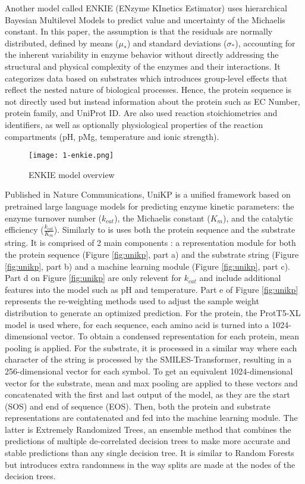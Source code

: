 Another model called ENKIE (ENzyme KInetics Estimator) uses hierarchical Bayesian Multilevel
Models to predict value and uncertainty of the Michaelis constant. In this paper, the assumption is that
the residuals are normally distributed, defined by means ($\mu_*$) and standard deviations ($\sigma_*$), 
accounting for the inherent variability in enzyme behavior without directly addressing 
the structural and physical complexity of the enzymes and their interactions. It categorizes data based on
substrates which introduces group-level effects that reflect the nested nature of 
biological processes. Hence, the protein sequence is not directly used but instead information about the
protein such as EC Number, protein family, and UniProt ID. Are also used reaction stoichiometries and
identifiers, as well as optionally physiological properties of the reaction compartments (pH, pMg, 
temperature and ionic strength).

\begin{figure}
  \centering
  \texttt{[image: 1-enkie.png]}
  \caption{ENKIE model overview}
  \label{fig:enkie}
\end{figure}

Published in Nature Communications, UniKP is a unified framework based on pretrained large language models
for predicting enzyme kinetic parameters: the enzyme turnover number ($k_{cat}$), the Michaelis constant
($K_m$), and the catalytic efficiency ($\frac{k_{cat}}{K_m}$). Similarly to \citeauthor{km1} is uses both the
protein sequence and the substrate string. It is comprised of 2 main components : a representation module 
for both the protein sequence (Figure \ref{fig:unikp}, part a) and the substrate string 
(Figure \ref{fig:unikp}, part b) and a machine learning module (Figure \ref{fig:unikp}, part c). 
Part d on Figure \ref{fig:unikp} are only relevent for $k_{cat}$ and include additional features into the model
such as pH and temperature. Part e of Figure \ref{fig:unikp} represents the re-weighting methods used 
to adjust the sample weight distribution to generate an optimized prediction. For the protein, the ProtT5-XL
model is used where, for each sequence, each amino acid is turned into a 1024-dimensional vector. To obtain
a condensed representation for each protein, mean pooling is applied. For the substrate, it is processed in
a similar way where each character of the string is processed by the SMILES-Transformer, resulting in a 
256-dimensional vector for each symbol. To get an equivalent 1024-dimensional vector for the substrate,
mean and max pooling are applied to these vectors and concatenated with the first and last output of the
model, as they are the start (SOS) and end of sequence (EOS). Then, both the protein and substrate representations
are contatenated and fed into the machine learning module. The latter is Extremely Randomized Trees, an
ensemble method that combines the predictions of multiple de-correlated decision trees to make more 
accurate and stable predictions than any single decision tree. It is similar to Random Forests but 
introduces extra randomness in the way splits are made at the nodes of the decision trees. \cite{extratrees}


